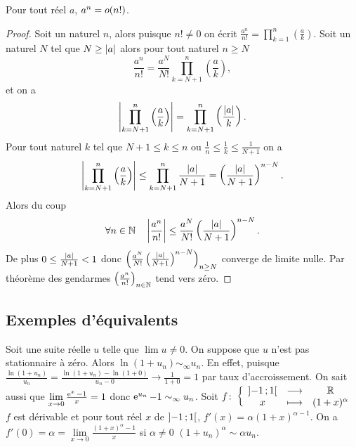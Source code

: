 \begin{prop}
  Pour tout réel $a$, $a^n=o\mathopen{}\left(n!\right)$.
\end{prop}
\begin{proof}
  Soit un naturel $n$, alors puisque $n! \neq 0$ on écrit $\frac{a^n}{n!}=\prod_{k=1}^n \left(\frac{a}{k}\right)$. Soit un naturel $N$ tel que $N \geq \left\lvert a\right\rvert$ alors pour tout naturel $n \geq N$
  \begin{equation}
    \frac{a^n}{n!} = \frac{a^N}{N!} \prod_{k=N+1}^n \left(\frac{a}{k}\right),
  \end{equation}
  et on a
  \begin{equation}
    \left\lvert\prod_{k=N+1}^n \left(\frac{a}{k}\right)\right\rvert = \prod_{k=N+1}^n \left(\frac{\left\lvert a\right\rvert}{k}\right).
  \end{equation}
  Pour tout naturel $k$ tel que $N+1 \leq k \leq n$ ou $\frac{1}{n} \leq \frac{1}{k} \leq \frac{1}{N+1}$ on a
  \begin{equation}
    \left\lvert\prod_{k=N+1}^n \left(\frac{a}{k}\right)\right\rvert \leq \prod_{k=N+1}^n \frac{\left\lvert a\right\rvert}{N+1} = \left(\frac{\left\lvert a\right\rvert}{N+1}\right)^{n-N}.
  \end{equation}
  Alors du coup
  \begin{equation}
    \forall n \in \mathbb{N} \quad \left\lvert\frac{a^n}{n!}\right\rvert \leq \frac{a^N}{N!} \left(\frac{\left\lvert a\right\rvert}{N+1}\right)^{n-N}.
  \end{equation}
  De plus $0 \leq \frac{\left\lvert a\right\rvert}{N+1} < 1$ donc $\left(\frac{a^N}{N!} \left(\frac{\left\lvert a\right\rvert}{N+1}\right)^{n-N}\right)_{n \geq N}$ converge de limite nulle. Par théorème des gendarmes $\left(\frac{a^n}{n!}\right)_{n\in \mathbb{N}}$ tend vers zéro.
\end{proof}

\subsection{Exemples d'équivalents}

Soit une suite réelle $u$ telle que $\lim u \neq 0$. On suppose que $u$ n'est pas stationnaire à zéro. Alors $\ln(1+u_n) \sim_\infty u_n$. En effet, puisque $\frac{\ln(1+u_n)}{u_n}= \frac{\ln(1+u_n) - \ln(1+0)}{u_n-0} \to \frac{1}{1+0} =1$ par taux d'accroissement. On sait aussi que $\lim\limits_{x \to 0} \frac{\operatorname{e}^{x}-1}{x}=1$ donc $\operatorname{e}^{u_n}-1 \sim_\infty u_n$. Soit $f\colon \left\{\begin{array}{ccc} \left] -1 \, ;  1 \right[ & \longrightarrow &\mathbb{R}\\ x & \longmapsto & (1+x)^\alpha \end{array} \right.$ $f$ est dérivable et pour tout réel $x$ de $\left] -1 \, ;  1 \right[$, $f'(x)=\alpha(1+x)^{\alpha -1}$. On a $f'(0)=\alpha = \lim\limits_{x \to 0}\frac{(1+x)^\alpha-1}{x}$ si $\alpha \neq 0$ $(1+u_n)^\alpha \sim \alpha u_n$.

